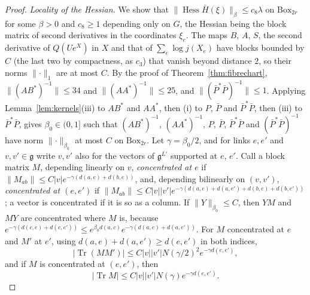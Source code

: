 \documentclass[11pt]{amsart}
\theoremstyle{definition}
\theoremstyle{remark}
\numberwithin{equation}{section}
\newcommand{\g}{\mathfrak{g}}
\newcommand{\Tr}{\operatorname{Tr}}
\begin{document}
\begin{proof}
\emph{Locality of the Hessian.} We show that $\lVert\operatorname{Hess}\bar
H(\xi)\rVert_\beta\le c_8\lambda$ on $\mathrm{Box}_{2r}$ for some $\beta>0$
and $c_8\ge1$ depending only on $G$, the Hessian being the block matrix of
second derivatives in the coordinates $\xi_e$. The maps $B$, $A$, $S$, the
second derivative of $Q(Ue^X)$ in $X$ and that of $\sum_e\log j(X_e)$ have
blocks bounded by $C$ (the last two by compactness, as $c_3$) that vanish
beyond distance $2$, so their norms $\lVert\cdot\rVert_1$ are at most $C$.
By the proof of Theorem~\ref{thm:fibrechart}, $\lVert(AB^*)^{-1}\rVert\le34$
and $\lVert(AA^*)^{-1}\rVert\le25$, and $\lVert(\bar P^*\bar P)^{-1}\rVert
\le1$. Applying Lemma~\ref{lem:kernels}(iii) to $AB^*$ and $AA^*$, then (i)
to $P$, $\bar P$ and $\bar P^*\bar P$, then (iii) to $\bar P^*\bar P$, gives
$\beta_0\in(0,1]$ such that $(AB^*)^{-1}$, $(AA^*)^{-1}$, $P$, $\bar P$,
$\bar P^*\bar P$ and $(\bar P^*\bar P)^{-1}$ have norm $\lVert\cdot\rVert
_{\beta_0}$ at most $C$ on $\mathrm{Box}_{2r}$. Let $\gamma=\beta_0/2$, and for
links $e,e'$ and $v,v'\in\g$ write $v,v'$ also for the vectors of
$\g^{L'}$ supported at $e$, $e'$. Call a block matrix $M$, depending
linearly on $v$, \emph{concentrated at $e$} if $\lVert M_{ab}\rVert\le C
\lvert v\rvert e^{-\gamma(d(a,e)+d(b,e))}$, and, depending bilinearly on
$(v,v')$, \emph{concentrated at $(e,e')$} if $\lVert M_{ab}\rVert\le C
\lvert v\rvert\lvert v'\rvert e^{-\gamma(d(a,e)+d(a,e')+d(b,e)+d(b,e'))}$;
a vector is concentrated if it is so as a column. If $\lVert Y\rVert_{\beta
_0}\le C$, then $YM$ and $MY$ are concentrated where $M$ is, because
$e^{-\gamma(d(c,e)+d(c,e'))}\le e^{\beta_0d(a,c)}e^{-\gamma(d(a,e)+d(a,
e'))}$. For
$M$ concentrated at $e$ and $M'$ at $e'$, using $d(a,e)+d(a,e')\ge d(e,e')$
in both indices,
\[
\lvert\Tr(MM')\rvert\le C\lvert v\rvert\lvert v'\rvert N(\gamma/2)^2
e^{-\gamma d(e,e')},
\]
and if $M$ is concentrated at $(e,e')$, then
\[
\lvert\Tr M\rvert\le C\lvert v\rvert\lvert v'\rvert N(\gamma)e^{-\gamma
d(e,e')}.
\]


\end{proof}
\end{document}
